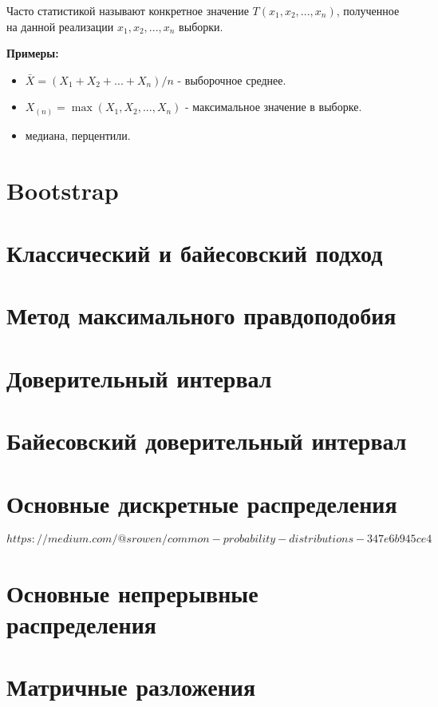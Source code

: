 Часто статистикой называют конкретное значение $T(x_1, x_2, ..., x_n)$, полученное на данной реализации $x_1, x_2, ..., x_n$ выборки.

\textbf{Примеры:}
\begin{itemize}
    \item $\bar{X} = (X_1 + X_2 + ... + X_n)/n$ - выборочное среднее.
    \item $X_{(n)} = \max(X_1, X_2, ..., X_n)$ - максимальное значение в выборке.
    \item медиана, перцентили.
\end{itemize}


\section{Bootstrap}


\section{Классический и байесовский подход}


\section{Метод максимального правдоподобия}


\section{Доверительный интервал}


\section{Байесовский доверительный интервал}


\section{Основные дискретные распределения}

$https://medium.com/@srowen/common-probability-distributions-347e6b945ce4$


\section{Основные непрерывные распределения}


\section{Матричные разложения}

